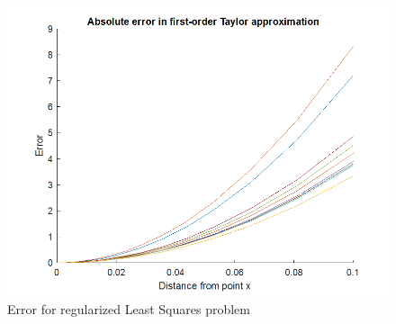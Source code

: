 \documentclass{article}
\begin{document}
		\begin{figure}[h]
		\centering
		\includegraphics[width=0.7\linewidth]{comp_image/q05}
		\caption[Error for regularized Least Squares problem]{Error for regularized Least Squares problem}
		\label{fig:q05}
	\end{figure}
	
\end{document}
